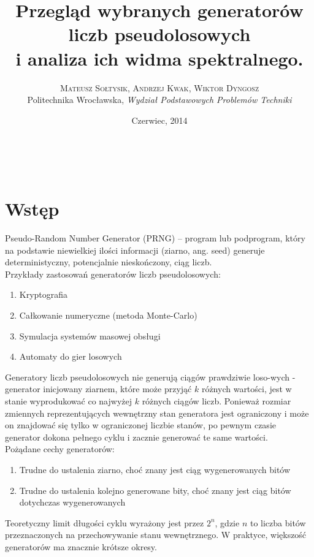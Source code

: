 \documentclass[a4paper, 11pt]{article} %
\title{\textbf{Przegląd wybranych generatorów liczb pseudolosowych}\\ %
i analiza ich widma spektralnego.} %
\author{\textsc{Mateusz Sołtysik, Andrzej Kwak, Wiktor Dyngosz} %
\\{Politechnika Wrocławska, \textit{Wydział Podstawowych Problemów Techniki}}} %
\date{Czerwiec, 2014} %
\makeatletter
\renewcommand{\maketitle}{ %
\begin{flushright} %
{\LARGE\@title} %

\vspace{50pt} %

{\large\@author} %
\\\@date %

\vspace{40pt} %
\end{flushright}
}
\makeatother
\begin{document}
\maketitle %
\pagebreak



\section*{Wstęp}
Pseudo-Random Number Generator (PRNG) – program lub podprogram, który na podstawie niewielkiej ilości informacji (ziarno, ang. seed) generuje deterministyczny, potencjalnie nieskończony, ciąg liczb.
\\Przykłady zastosowań generatorów liczb pseudolosowych:
\begin{enumerate}
\item Kryptografia
\item Całkowanie numeryczne (metoda Monte-Carlo)
\item Symulacja systemów masowej obsługi
\item Automaty do gier losowych
\end{enumerate}
Generatory liczb pseudolosowych nie generują ciągów prawdziwie loso-wych - generator inicjowany ziarnem, które może przyjąć $k$ różnych wartości, jest w stanie wyprodukować co najwyżej $k$ różnych ciągów liczb. Ponieważ rozmiar zmiennych reprezentujących wewnętrzny stan generatora jest ograniczony i może on znajdować się tylko w ograniczonej liczbie stanów, po pewnym czasie generator dokona pełnego cyklu i zacznie generować te same wartości.
\\Pożądane cechy generatorów:
\begin{enumerate}
\item Trudne do ustalenia ziarno, choć znany jest ciąg wygenerowanych bitów
\item Trudne do ustalenia kolejno generowane bity, choć znany jest ciąg bitów dotychczas wygenerowanych
\end{enumerate}
Teoretyczny limit długości cyklu wyrażony jest przez $2^n$, gdzie $n$ to liczba bitów przeznaczonych na przechowywanie stanu wewnętrznego. W praktyce, większość generatorów ma znacznie krótsze okresy.
\end{document}

